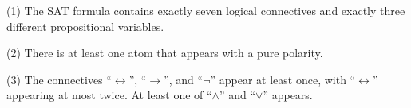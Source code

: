 \noindent(1) %
        The SAT formula contains exactly seven logical connectives 
        and exactly three different propositional variables. \smallskip

\noindent(2)        
        There is at least one atom that appears with a pure polarity.\smallskip
        
\noindent(3) %
        The connectives ``$\leftrightarrow$'', ``$\rightarrow$'', and ``$\lnot$'' appear at least once,
        with ``$\leftrightarrow$'' appearing at most twice.
        At least one of ``$\land$'' and ``$\lor$'' appears. \smallskip
        
        

